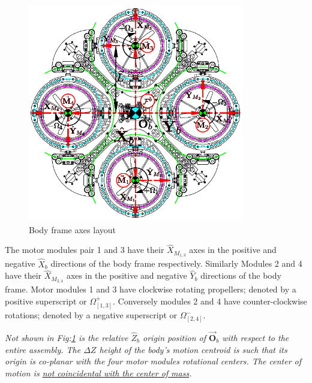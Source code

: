 \begin{figure}[htbp]
\vspace{-10pt}
\centering
\includegraphics[width=0.84\textwidth]{figs/body-frame}
\vspace{-12pt}
\caption{Body frame axes layout}
\label{fig:body-frame}
\vspace{-16pt}
\end{figure}
\par
The motor modules pair 1 and 3 have their $\hat{X}_{M_{1,3}}$ axes in the positive and negative $\hat{X}_b$ directions of the body frame respectively. Similarly Modules 2 and 4 have their $\hat{X}_{M_{2,4}}$ axes in the positive and negative $\hat{Y}_b$ directions of the body frame. Motor modules 1 and 3 have clockwise rotating propellers; denoted by a positive superscript or $\Omega_{[1,3]}^{+}$. Conversely modules 2 and 4 have counter-clockwise rotations; denoted by a negative superscript or $\Omega_{[2,4]}^{-}$.
\par
\emph{\color{Gray}Not shown in Fig:\ref{fig:body-frame} is the relative $\hat{Z}_b$ origin position of $\vec{\mathbf{O}}_b$ with respect to the entire assembly. The $\Delta Z$ height of the body's motion centroid is such that its origin is co-planar with the four motor modules rotational centers. The center of motion is \underline{not coincidental with the center of mass}.}
\par

